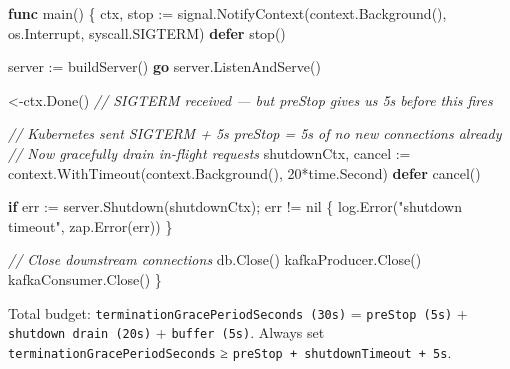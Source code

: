 \documentclass[
]{article}
\newenvironment{Shaded}{}{}
\newcommand{\CommentTok}[1]{\textcolor[rgb]{0.38,0.63,0.69}{\textit{#1}}}
\newcommand{\ControlFlowTok}[1]{\textcolor[rgb]{0.00,0.44,0.13}{\textbf{#1}}}
\newcommand{\DecValTok}[1]{\textcolor[rgb]{0.25,0.63,0.44}{#1}}
\newcommand{\KeywordTok}[1]{\textcolor[rgb]{0.00,0.44,0.13}{\textbf{#1}}}
\newcommand{\NormalTok}[1]{#1}
\newcommand{\OperatorTok}[1]{\textcolor[rgb]{0.40,0.40,0.40}{#1}}
\newcommand{\OtherTok}[1]{\textcolor[rgb]{0.00,0.44,0.13}{#1}}
\newcommand{\StringTok}[1]{\textcolor[rgb]{0.25,0.44,0.63}{#1}}
\begin{document}
\begin{Shaded}
\begin{Highlighting}[]
\KeywordTok{func}\NormalTok{ main}\OperatorTok{()} \OperatorTok{\{}
\NormalTok{    ctx}\OperatorTok{,}\NormalTok{ stop }\OperatorTok{:=}\NormalTok{ signal}\OperatorTok{.}\NormalTok{NotifyContext}\OperatorTok{(}\NormalTok{context}\OperatorTok{.}\NormalTok{Background}\OperatorTok{(),}\NormalTok{ os}\OperatorTok{.}\NormalTok{Interrupt}\OperatorTok{,}\NormalTok{ syscall}\OperatorTok{.}\NormalTok{SIGTERM}\OperatorTok{)}
    \ControlFlowTok{defer}\NormalTok{ stop}\OperatorTok{()}

\NormalTok{    server }\OperatorTok{:=}\NormalTok{ buildServer}\OperatorTok{()}
    \ControlFlowTok{go}\NormalTok{ server}\OperatorTok{.}\NormalTok{ListenAndServe}\OperatorTok{()}

    \OperatorTok{\textless{}{-}}\NormalTok{ctx}\OperatorTok{.}\NormalTok{Done}\OperatorTok{()} \CommentTok{// SIGTERM received — but preStop gives us 5s before this fires}

    \CommentTok{// Kubernetes sent SIGTERM + 5s preStop = 5s of no new connections already}
    \CommentTok{// Now gracefully drain in{-}flight requests}
\NormalTok{    shutdownCtx}\OperatorTok{,}\NormalTok{ cancel }\OperatorTok{:=}\NormalTok{ context}\OperatorTok{.}\NormalTok{WithTimeout}\OperatorTok{(}\NormalTok{context}\OperatorTok{.}\NormalTok{Background}\OperatorTok{(),} \DecValTok{20}\OperatorTok{*}\NormalTok{time}\OperatorTok{.}\NormalTok{Second}\OperatorTok{)}
    \ControlFlowTok{defer}\NormalTok{ cancel}\OperatorTok{()}

    \ControlFlowTok{if}\NormalTok{ err }\OperatorTok{:=}\NormalTok{ server}\OperatorTok{.}\NormalTok{Shutdown}\OperatorTok{(}\NormalTok{shutdownCtx}\OperatorTok{);}\NormalTok{ err }\OperatorTok{!=} \OtherTok{nil} \OperatorTok{\{}
\NormalTok{        log}\OperatorTok{.}\NormalTok{Error}\OperatorTok{(}\StringTok{"shutdown timeout"}\OperatorTok{,}\NormalTok{ zap}\OperatorTok{.}\NormalTok{Error}\OperatorTok{(}\NormalTok{err}\OperatorTok{))}
    \OperatorTok{\}}

    \CommentTok{// Close downstream connections}
\NormalTok{    db}\OperatorTok{.}\NormalTok{Close}\OperatorTok{()}
\NormalTok{    kafkaProducer}\OperatorTok{.}\NormalTok{Close}\OperatorTok{()}
\NormalTok{    kafkaConsumer}\OperatorTok{.}\NormalTok{Close}\OperatorTok{()}
\OperatorTok{\}}
\end{Highlighting}
\end{Shaded}

Total budget: \texttt{terminationGracePeriodSeconds\ (30s)} =
\texttt{preStop\ (5s)} + \texttt{shutdown\ drain\ (20s)} +
\texttt{buffer\ (5s)}. Always set \texttt{terminationGracePeriodSeconds}
≥ \texttt{preStop\ +\ shutdownTimeout\ +\ 5s}.
\end{document}
